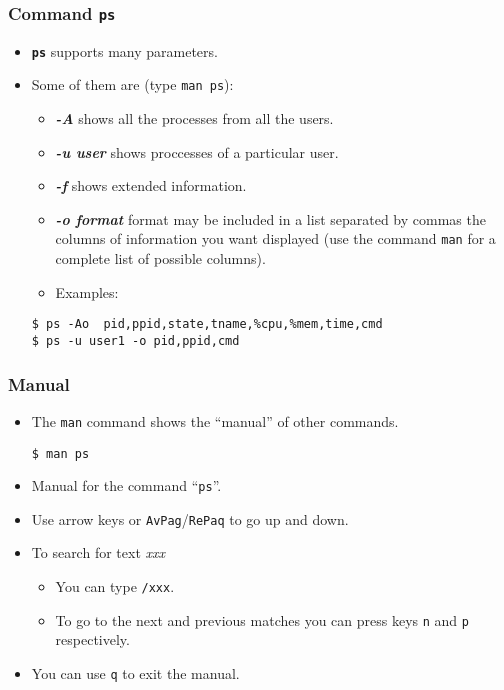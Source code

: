 \begin{frame}[fragile]\frametitle{Command \texttt{ps}}
\begin{itemize}
\item \texttt{\textbf{ps}}  supports many parameters. 
\item Some of them are (type \texttt{man ps}):
  \begin{itemize}
  \scriptsize
  \item \textit{\textbf{-A}} shows all the processes from all the users. \\
  \item \textit{\textbf{-u user}} shows proccesses of a particular user. \\
  \item \textit{\textbf{-f}} shows extended information. \\
  \item \textit{\textbf{-o format}} format may be included in a list separated by commas
  the columns of information you want displayed (use the command \texttt{man}
  for a complete list of possible columns). 
  \item Examples: 
  \end{itemize}

\scriptsize
\begin{lstlisting}
$ ps -Ao  pid,ppid,state,tname,%cpu,%mem,time,cmd
$ ps -u user1 -o pid,ppid,cmd
\end{lstlisting}
\end{itemize}
\end{frame}

\begin{frame}[fragile]\frametitle{Manual}
\begin{itemize}
 \item The \verb|man| command shows the ``manual'' of other commands. 
\begin{lstlisting}
$ man ps
\end{lstlisting}
\item Manual for the command ``\texttt{ps}''. 
\item Use arrow keys or \texttt{AvPag}/\texttt{RePaq} to go up and down. 
\item To search for text \textit{xxx} 
  \begin{itemize}
  \item You can type \texttt{/xxx}. 
  \item To go to the next and previous matches you can press keys
  \texttt{n} and \texttt{p} respectively. 
  \end{itemize}
\item You can use \texttt{q} to exit the manual.
\end{itemize}
\end{frame}

